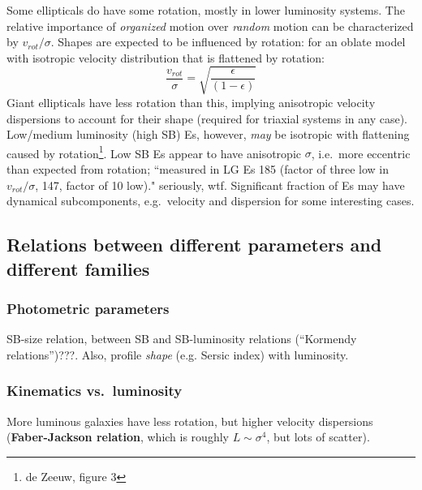 \documentclass{article}
\newcommand{\mynotes}[1]{\textcolor{cadmiumgreen}{#1}}
\begin{document}
Some ellipticals do have some rotation, mostly in lower luminosity systems.
The relative importance of \emph{organized} motion over \emph{random} motion
can be characterized by $v_{rot}/\sigma$.  Shapes are expected to be influenced
by rotation: for an oblate model with isotropic velocity distribution that is
flattened by rotation:
\[
    \frac{v_{rot}}{\sigma} = \sqrt{\frac{\epsilon}{\left(1-\epsilon\right)}}
\]
Giant ellipticals have less rotation than this, implying anisotropic velocity
dispersions to account for their shape (required for triaxial systems in any
case).  Low/medium luminosity (high SB) Es, however, \emph{may} be isotropic
with flattening caused by rotation\footnote{de Zeeuw, figure 3}.  Low SB Es
appear to have anisotropic $\sigma$, i.e.\ more eccentric than expected from
rotation; ``measured in LG Es 185 (factor of three low in $v_{rot}/\sigma$,
147, factor of 10 low)." \mynotes{seriously, wtf}.  Significant fraction of Es
may have dynamical subcomponents, e.g.\ velocity and dispersion for some
interesting cases.

\subsection{Relations between different parameters and different families}
\subsubsection{Photometric parameters}
SB-size relation, between SB and SB-luminosity relations
(``Kormendy relations'')\mynotes{???}.
Also, profile \emph{shape} (e.g. Sersic index) with luminosity.

\subsubsection{Kinematics vs.\ luminosity}
More luminous galaxies have less rotation, but higher velocity dispersions
(\textbf{Faber-Jackson relation}, which is roughly $L\sim\sigma^{4}$, but
lots of scatter).
\end{document}
